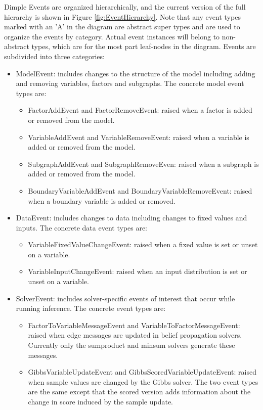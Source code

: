 Dimple Events are organized hierarchically, and the current version of the full hierarchy is shown in Figure \ref{fig:EventHierarchy}. Note that any event types marked with an 'A' in the diagram are abstract super types and are used to organize the events by category. Actual event instances will belong to non-abstract types, which are for the most part leaf-nodes in the diagram. Events are subdivided into three categories:

\begin{itemize}
\item ModelEvent: includes changes to the structure of the model including adding and removing variables, factors and subgraphs. The concrete model event types are:
  \begin{itemize}
  \item FactorAddEvent and FactorRemoveEvent: raised when a factor is added or removed from the model.
  \item VariableAddEvent and VariableRemoveEvent: raised when a variable is added or removed from the model.
  \item SubgraphAddEvent and SubgraphRemoveEven: raised when a subgraph is added or removed from the model.
  \item BoundaryVariableAddEvent and BoundaryVariableRemoveEvent: raised when a boundary variable is added or removed.
  \end{itemize}
\item DataEvent: includes changes to data including changes to fixed values and inputs. The concrete data event types are:
  \begin{itemize}
  \item VariableFixedValueChangeEvent: raised when a fixed value is set or unset on a variable.
  \item VariableInputChangeEvent: raised when an input distribution is set or unset on a variable.
  \end{itemize}
\item SolverEvent: includes solver-specific events of interest that occur while running inference. The concrete event types are:
  \begin{itemize}
  \item FactorToVariableMessageEvent and VariableToFactorMessageEvent: raised when edge messages are updated in belief propagation solvers. Currently only the sumproduct and minsum solvers generate these messages.
  \item GibbsVariableUpdateEvent and GibbsScoredVariableUpdateEvent: raised when sample values are changed by the Gibbs solver. The two event types are the same except that the scored version adds information about the change in score induced by the sample update.
  \end{itemize}
\end{itemize}


